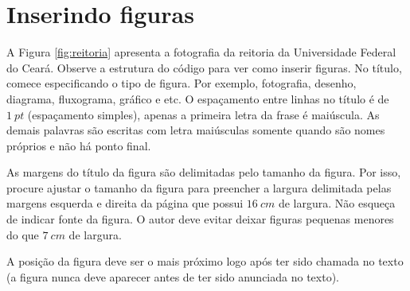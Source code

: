 \section{Inserindo figuras}\label{sec:figuras}
    
    A Figura \ref{fig:reitoria} apresenta a fotografia da reitoria da Universidade Federal do Ceará. Observe a estrutura do código para ver como inserir figuras. No título, comece especificando o tipo de figura. Por exemplo, fotografia, desenho, diagrama, fluxograma, gráfico e etc. O espaçamento entre linhas no título é de $1~pt$ (espaçamento simples), apenas a primeira letra da frase é maiúscula. As demais palavras são escritas com letra maiúsculas somente quando são nomes próprios e não há ponto final. 
    
    As margens do título da figura são delimitadas pelo tamanho da figura. Por isso, procure ajustar o tamanho da figura para preencher a largura delimitada pelas margens esquerda e direita da página que possui $16~cm$ de largura. Não esqueça de indicar fonte da figura. O autor deve evitar deixar figuras pequenas menores do que $7~cm$ de largura.
    
    A posição da figura deve ser o mais próximo logo após ter sido chamada no texto (a figura nunca deve aparecer antes de ter sido anunciada no texto). 
    
 	\begin{figure}[h!] 
   	    \captionsetup{width=16cm}%
	\end{figure}
	
